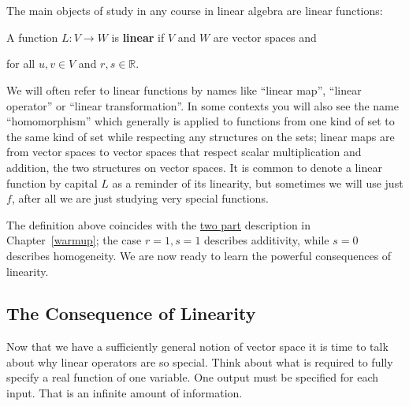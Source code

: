 
\chapter{\linTransTitle}
\label{sec:linearTransformation}

The main objects of study in any course in linear algebra are linear functions:

\begin{definition}
A function $L \colon V\rightarrow W$ is {\bfseries linear} if $V$ and $W$ are vector spaces and 
\begin{center}
\end{center}
 for all $u,v \in V$ and $r,s \in \mathbb{R}$.
\end{definition}



\begin{remark}
We will often refer to linear functions by names like ``linear map'', ``linear operator'' or ``linear transformation''. In some contexts
you will also see the name ``homomorphism'' which generally is applied to functions from one kind of set to the same kind of set while respecting any  structures on the sets; linear maps are from vector spaces to vector spaces that respect scalar multiplication and addition, the two structures on vector spaces. It is common to denote a linear function by capital $L$ as a reminder of its linearity, but sometimes we will use just $f$, after all we are just studying very special functions.
\end{remark}

The definition above coincides with the \hyperlink{twopart}{two part} description in Chapter~\ref{warmup};
the case $r=1,s=1$ describes additivity, while  $s=0$ describes homogeneity. 
We are now ready to learn the powerful consequences of linearity.

\section{The Consequence of Linearity}

Now that we have a sufficiently general notion of vector space 
it is time to talk about why linear operators are so special. 
Think about what is required to fully specify a real function of one variable. 
One output must be specified for each input. 
That is an infinite amount of information. 

